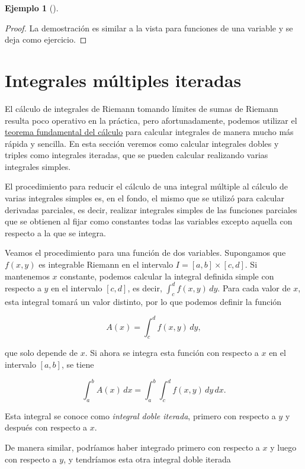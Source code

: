 \documentclass[
  a4paper,
]{scrreport}
\theoremstyle{definition}
\newtheorem{example}{Ejemplo}[chapter]
\theoremstyle{plain}
\theoremstyle{definition}
\theoremstyle{definition}
\theoremstyle{plain}
\theoremstyle{plain}
\theoremstyle{remark}
\begin{document}
\begin{example}[]
\begin{tcolorbox}
\begin{proof}
La demostración es similar a la vista para funciones de una variable y
se deja como ejercicio.
\end{proof}

\end{tcolorbox}

\section{Integrales múltiples
iteradas}\label{integrales-muxfaltiples-iteradas}

El cálculo de integrales de Riemann tomando límites de sumas de Riemann
resulta poco operativo en la práctica, pero afortunadamente, podemos
utilizar el
\href{http://localhost:1313/09-integrales.html\#teorema-fundamental-del-c\%C3\%A1lculo}{teorema
fundamental del cálculo} para calcular integrales de manera mucho más
rápida y sencilla. En esta sección veremos como calcular integrales
dobles y triples como integrales iteradas, que se pueden calcular
realizando varias integrales simples.

El procedimiento para reducir el cálculo de una integral múltiple al
cálculo de varias integrales simples es, en el fondo, el mismo que se
utilizó para calcular derivadas parciales, es decir, realizar integrales
simples de las funciones parciales que se obtienen al fijar como
constantes todas las variables excepto aquella con respecto a la que se
integra.

Veamos el procedimiento para una función de dos variables. Supongamos
que \(f(x,y)\) es integrable Riemann en el intervalo
\(I=[a,b]\times [c,d]\). Si mantenemos \(x\) constante, podemos calcular
la integral definida simple con respecto a \(y\) en el intervalo
\([c,d]\), es decir, \(\int_c^d f(x,y)\, dy\). Para cada valor de \(x\),
esta integral tomará un valor distinto, por lo que podemos definir la
función

\[
A(x) = \int_c^d f(x,y)\,dy,
\]

que solo depende de \(x\). Si ahora se integra esta función con respecto
a \(x\) en el intervalo \([a,b]\), se tiene

\[
\int_a^b A(x)\,dx = \int_a^b\int_c^d f(x,y)\,dy\,dx.
\]

Esta integral se conoce como \emph{integral doble iterada}, primero con
respecto a \(y\) y después con respecto a \(x\).

De manera similar, podríamos haber integrado primero con respecto a
\(x\) y luego con respecto a \(y\), y tendríamos esta otra integral
doble iterada


\end{example}
\end{document}
